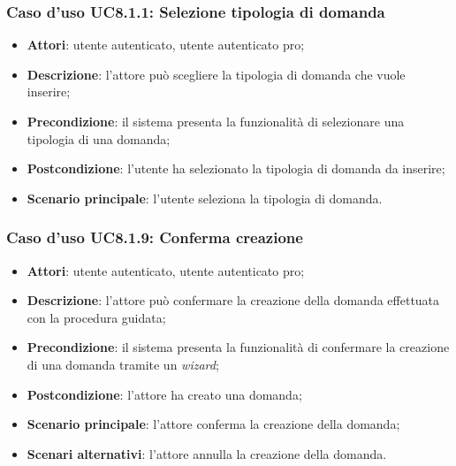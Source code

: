 	\subsubsection{Caso d'uso UC8.1.1: Selezione tipologia di domanda}
	\begin{itemize}
		\item
			\textbf{Attori}: utente autenticato, utente autenticato pro;
		\item
			\textbf{Descrizione}: l'attore può scegliere la tipologia di domanda che vuole inserire;
		\item		
			\textbf{Precondizione}: il sistema presenta la funzionalità di selezionare una tipologia di una domanda;
		\item
			\textbf{Postcondizione}: l'utente ha selezionato la tipologia di domanda da inserire;
		\item 
			\textbf{Scenario principale}: l'utente seleziona la tipologia di domanda.
	\end{itemize}










	\subsubsection{Caso d'uso UC8.1.9: Conferma creazione}
	\begin{itemize}
		\item
			\textbf{Attori}: utente autenticato, utente autenticato pro;
		\item
			\textbf{Descrizione}: l'attore può confermare la creazione della domanda effettuata con la procedura guidata;
		\item		
			\textbf{Precondizione}: il sistema presenta la funzionalità di confermare la creazione di una domanda tramite un \textit{wizard};
		\item
			\textbf{Postcondizione}: l'attore ha creato una domanda;
		\item
			\textbf{Scenario principale}: l'attore conferma la creazione della domanda;		
		\item
	 		\textbf{Scenari alternativi}: l'attore annulla la creazione della domanda.
					
	\end{itemize}	
	
